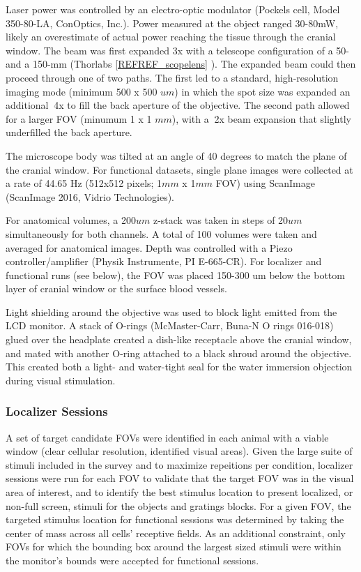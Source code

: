 Laser power was controlled by an electro-optic modulator (Pockels cell, Model 350-80-LA, ConOptics, Inc.). Power measured at the object ranged 30-80mW, likely an overestimate of actual power reaching the tissue through the cranial window. The beam was first expanded 3x with a telescope configuration of a 50- and a 150-mm (Thorlabs \ref{REFREF_scopelens} ). The expanded beam could then proceed through one of two paths. The first led to a standard, high-resolution imaging mode (minimum 500 x 500 $um$) in which the spot size was expanded an additional $~$4x to fill the back aperture of the objective. The second path allowed for a larger FOV (minumum 1 x 1 $mm$), with a $~$2x beam expansion that slightly underfilled the back aperture. 

The microscope body was tilted at an angle of 40 degrees to match the plane of the cranial window. For functional datasets, single plane images were collected at a rate of 44.65 Hz (512x512 pixels; 1$mm$ x 1$mm$ FOV) using ScanImage\cite{Pologruto2003} (ScanImage 2016, Vidrio Technologies). 

For anatomical volumes, a 200$um$ z-stack was taken in steps of 20$um$ simultaneously for both channels. A total of 100 volumes were taken and averaged for anatomical images. Depth was controlled with a Piezo controller/amplifier (Physik Instrumente, PI E-665-CR). For localizer and functional runs (see below), the FOV was placed 150-300 um below the bottom layer of cranial window or the surface blood vessels. 

Light shielding around the objective was used to block light emitted from the LCD monitor. A stack of O-rings (McMaster-Carr, Buna-N O rings 016-018) glued over the headplate created a dish-like receptacle above the cranial window\cite{Goldey2014}, and mated with another O-ring attached to a black shroud around the objective. This created both a light- and water-tight seal for the water immersion objection during visual stimulation. 

\subsubsection{Localizer Sessions}
A set of target candidate FOVs were identified in each animal with a viable window (clear cellular resolution, identified visual areas). Given the large suite of stimuli included in the survey and to maximize repeitions per condition, localizer sessions were run for each FOV to validate that the target FOV was in the visual area of interest, and to identify the best stimulus location to present localized, or non-full screen, stimuli for the objects and gratings blocks. For a given FOV, the targeted stimulus location for functional sessions was determined by taking the center of mass across all cells' receptive fields. As an additional constraint, only FOVs for which the bounding box around the largest sized stimuli were within the monitor's bounds were accepted for functional sessions.

